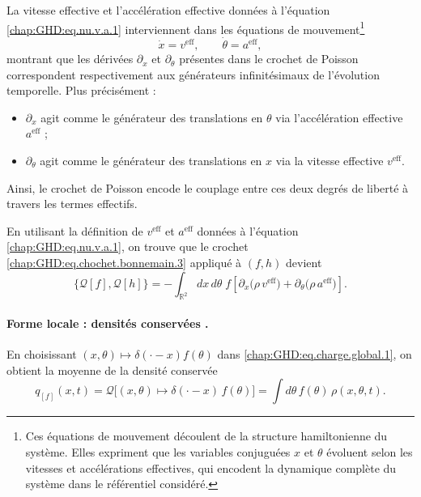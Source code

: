 \medskip

La vitesse effective et l'accélération effective données à l'équation \eqref{chap:GHD:eq.nu.v.a.1} interviennent dans les équations de mouvement\footnote{Ces équations de mouvement découlent de la structure hamiltonienne du système. Elles expriment que les variables conjuguées $x$ et $\theta$ évoluent selon les vitesses et accélérations effectives, qui encodent la dynamique complète du système dans le référentiel considéré.}
\begin{equation}\label{chap:GHD:eq.nu.v.a.1.1}
    \dot{x} = v^{\mathrm{eff}}, \qquad \dot{\theta} = a^{\mathrm{eff}},
\end{equation}
montrant que les dérivées $\partial_x$ et $\partial_\theta$ présentes dans le crochet de Poisson %
correspondent respectivement aux générateurs infinitésimaux de l'évolution temporelle. Plus précisément :
\begin{itemize}[label = $\bullet$ ]
    \item $\partial_x$ agit comme le générateur des translations en $\theta$ via l'accélération effective $a^{\mathrm{eff}}$ ;
    \item $\partial_\theta$ agit comme le générateur des translations en $x$ via la vitesse effective $v^{\mathrm{eff}}$.
\end{itemize}
Ainsi, le crochet de Poisson encode le couplage entre ces deux degrés de liberté à travers les termes effectifs.

\medskip 

En utilisant la définition de $v^{\mathrm{eff}}$ et $a^{\mathrm{eff}}$ données à l'équation \eqref{chap:GHD:eq.nu.v.a.1}, on trouve que le crochet \eqref{chap:GHD:eq.chochet.bonnemain.3} appliqué à $(f,h)$ devient 
\begin{equation}\label{chap:GHD:eq.chochet.bonnemain.4}
	\{\mathcal{Q}[f], \mathcal{Q}[h]\} 
	= - \int_{\mathbb{R}^2} dx\, d\theta \; f \left[ \partial_x \big( \rho \, v^{\mathrm{eff}} \big) 
	+ \partial_\theta \big( \rho \, a^{\mathrm{eff}} \big) \right].
\end{equation}

\paragraph{Forme locale : densités conservées .} 
En choisissant $(x,\theta) \mapsto \delta(\cdot - x)f(\theta)$ dans \eqref{chap:GHD:eq.charge.global.1}, on obtient la moyenne de la densité conservée \ie
\begin{equation}\label{chap:GHD:eq.chochet.bonnemain.4.11}
	q_{[f]}(x,t) = \mathcal{Q} \big[ (x,\theta) \mapsto \delta(\cdot - x) \, f(\theta) \big] =\int d\theta\, f(\theta)\,\rho(x,\theta,t).
\end{equation}

